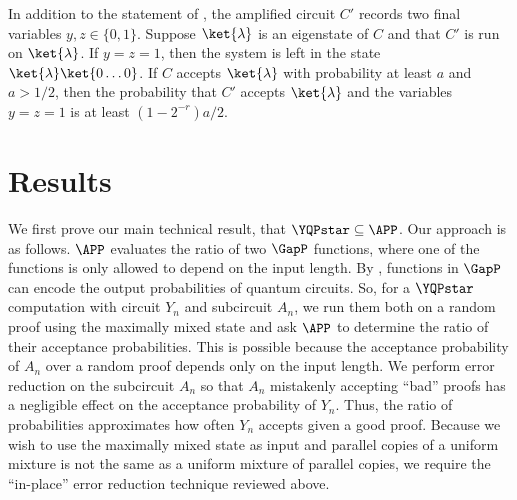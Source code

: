 \begin{lemma}\label{lem:MW2}
	In addition to the statement of ,
	the amplified circuit
	$C'$ records two final variables $y,z\in \{0,1\}$.
	Suppose $\ket{\lambda}$ is an eigenstate of $C$
	and that
	$C'$ is run on $\ket{\lambda}$.
	If
	$y=z=1$,
	then the system is left in the state $\ket{\lambda}\ket{0\dots 0}$.
	If $C$ accepts $\ket{\lambda}$ with probability at least $a$ and $a > 1/2$,
	then the probability that $C'$ accepts $\ket{\lambda}$ and the variables $y=z=1$ is at least $\left(1-2^{-r}\right) a /2$.
\end{lemma}


%
\section{Results}

We first prove our main technical result, that $\YQPstar\subseteq \APP$.
Our approach is as follows.
$\APP$ evaluates the ratio of two $\GapP$ functions, where one of the functions
is only allowed to depend on the input length. By , functions
in $\GapP$ can encode the output probabilities of quantum circuits.
So, for a $\YQPstar$ computation with circuit $Y_n$ and subcircuit $A_n$,
we run them both on a random proof using the maximally mixed state
and ask $\APP$ to determine the ratio of their acceptance probabilities.
This is possible because the acceptance probability of $A_n$ over a random proof
depends only on the input length.
We perform error reduction on the subcircuit $A_n$ so that
$A_n$ mistakenly accepting ``bad'' proofs has a negligible effect on the acceptance probability of $Y_n$.
Thus, the ratio of probabilities approximates how often
$Y_n$ accepts given a good proof.
Because we wish to use the maximally mixed state as input
and parallel copies of a uniform mixture
is not the same as a uniform mixture of parallel copies,
we require the ``in-place'' error reduction technique reviewed above.


